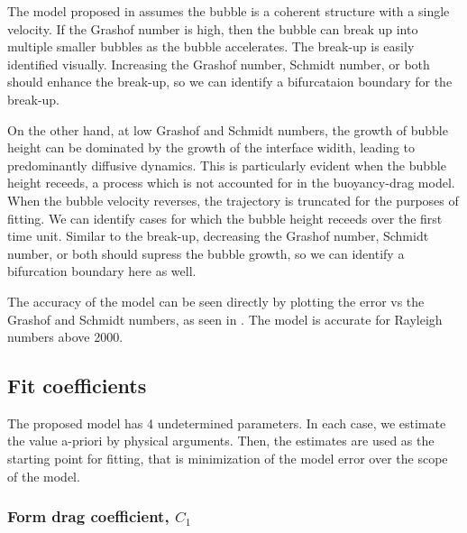 The model proposed in  assumes the bubble is a coherent structure with a single velocity.
If the Grashof number is high, then the bubble can break up into multiple smaller bubbles as the bubble accelerates.
The break-up is easily identified visually.
Increasing the Grashof number, Schmidt number, or both should enhance the break-up, so we can identify a bifurcataion boundary for the break-up.

On the other hand, at low Grashof and Schmidt numbers, the growth of bubble height can be dominated by the growth of the interface widith, leading to predominantly diffusive dynamics.
This is particularly evident when the bubble height receeds, a process which is not accounted for in the buoyancy-drag model.
When the bubble velocity reverses, the trajectory is truncated for the purposes of fitting.
We can identify cases for which the bubble height receeds over the first time unit.
Similar to the break-up, decreasing the Grashof number, Schmidt number, or both should supress the bubble growth, so we can identify a bifurcation boundary here as well.

The accuracy of the model can be seen directly by plotting the error vs the Grashof and Schmidt numbers, as seen in .
The model is accurate for Rayleigh numbers above 2000.

\subsection{Fit coefficients}
The proposed model has 4 undetermined parameters.
In each case, we estimate the value a-priori by physical arguments.
Then, the estimates are used as the starting point for fitting, that is minimization of the model error over the scope of the model.

\subsubsection{Form drag coefficient, $C_1$}

